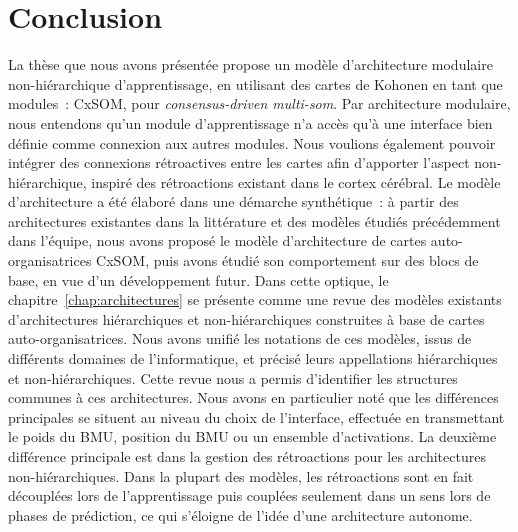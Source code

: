 \chapter*{Conclusion}



La thèse que nous avons présentée propose un modèle d'architecture modulaire non-hiérarchique d'apprentissage, en utilisant des cartes de Kohonen en tant que modules~: CxSOM, pour \emph{consensus-driven multi-som}.
Par architecture modulaire, nous entendons qu'un module d'apprentissage n'a accès qu'à une interface bien définie comme connexion aux autres modules. Nous voulions également pouvoir intégrer des connexions rétroactives entre les cartes afin d'apporter l'aspect non-hiérarchique, inspiré des rétroactions existant dans le cortex cérébral.
Le modèle d'architecture a été élaboré dans une démarche synthétique~: à partir des architectures existantes dans la littérature et des modèles étudiés précédemment dans l'équipe, nous avons proposé le modèle d'architecture de cartes auto-organisatrices CxSOM, puis avons étudié son comportement sur des blocs de base, en vue d'un développement futur.
Dans cette optique, le chapitre~\ref{chap:architectures} se présente comme une revue des modèles existants d'architectures hiérarchiques et non-hiérarchiques construites à base de cartes auto-organisatrices. Nous avons unifié les notations de ces modèles, issus de différents domaines de l'informatique, et précisé leurs appellations hiérarchiques et non-hiérarchiques. Cette revue nous a permis d'identifier les structures communes à ces architectures. Nous avons en particulier noté que les différences principales se situent au niveau du choix de l'interface, effectuée en transmettant le poids du BMU, position du BMU ou un ensemble d'activations. La deuxième différence principale est dans la gestion des rétroactions pour les architectures non-hiérarchiques. Dans la plupart des modèles, les rétroactions sont en fait découplées lors de l'apprentissage puis couplées seulement dans un sens lors de phases de prédiction, ce qui s'éloigne de l'idée d'une architecture autonome.


